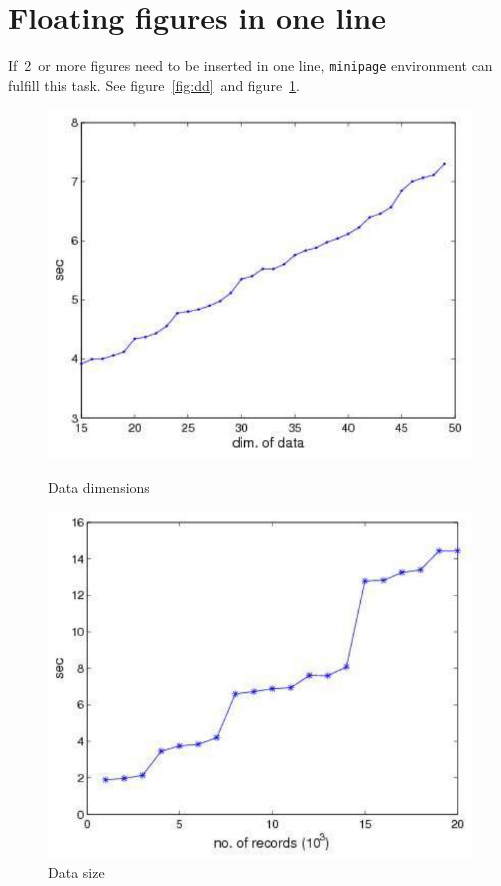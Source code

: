 \section{Floating figures in one line}
If~2~or more figures need to be inserted in one line, \verb|minipage| environment can fulfill this task. See figure~\ref{fig:dd}~and figure~\ref{fig:ds}.
\begin{figure}[htbp]
	\centering
	\begin{minipage}{0.4\textwidth}
		\centering
		\includegraphics[width=\textwidth]{figures/dataDimensions.pdf}
		\caption{Data dimensions}\label{fig:dd}
	\end{minipage}
	\begin{minipage}{0.4\textwidth}
		\centering
		\includegraphics[width=\textwidth]{figures/dataSize.pdf}
		\caption{Data size}\label{fig:ds}
	\end{minipage}
	\vspace{\baselineskip}
\end{figure}


